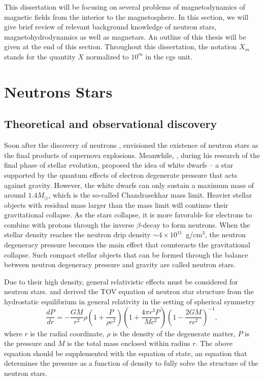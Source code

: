 This dissertation will be focusing on several problems of magnetodynamics of magnetic fields from the interior to the magnetosphere. 
In this section, we will give brief review of relevant background knowledge of neutron stars, magnetohydrodynamics as well as magnetars. An outline of this thesis will be given at the end of this section.
Throughout this dissertation, the notation $X_m$ stands for the quantity $X$ normalized to $10^m$ in the cgs unit.

\section{Neutrons Stars}
\label{sec:intro-NS}

\subsection{Theoretical and observational discovery}

Soon after the discovery of neutrons \citep{1932Natur.129Q.312C}, \citet{1934PhRv...46...76B} envisioned the existence of neutron stars as the final products of supernova explosions.
Meanwhile, \citet{1935MNRAS..95..226C}, during his research of the final phase of stellar evolution, proposed the idea of white dwarfs -- a star supported by the quantum effects of electron degenerate pressure that acts against gravity.
However, the white dwarfs can only sustain a maximum mass of around $1.4M_\odot$, which is the so-called Chandrasekhar mass limit. 
Heavier stellar objects with residual mass larger than the mass limit will continue their gravitational collapse.
As the stars collapse, it is more favorable for electrons to combine with protons through the inverse $\beta$-decay to form neutrons.
When the stellar density reaches the neutron drip density $\sim 4\times 10^{11}$~g/cm$^3$, the neutron degeneracy pressure becomes the main effect that counteracts the gravitational collapse.
Such compact stellar objects that can be formed through the balance between neutron degeneracy pressure and gravity are called neutron stars.

Due to their high density, general relativistic effects must be considered for neutron stars. \citet{1939PhRv...55..364T} and \citet{1939PhRv...55..374O} derived the TOV equation of neutron star structure from the hydrostatic equilibrium in general relativity in the setting of spherical symmetry
%
\begin{equation}\label{eq:TOV}
	\frac{d P}{dr} = -\frac{G M}{r^2} \rho \left(1+\frac{P}{\rho c^2} \right) \left( 1+\frac{4\pi r^3 P}{M c^2} \right) \left( 1-\frac{2GM}{rc^2} \right)^{-1},
\end{equation}
%
where $r$ is the radial coordinate, $\rho$ is the density of the degenerate matter, $P$ is the pressure and $M$ is the total mass enclosed within radius $r$.
The above equation should be supplemented with the equation of state, an equation that determines the pressure as a function of density to fully solve the structure of the neutron stars.

